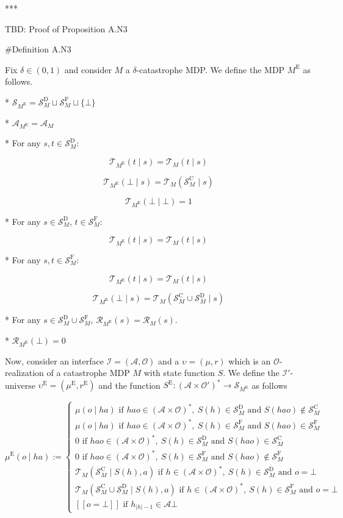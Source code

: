 \documentclass[a4paper]{article}
\newcommand{\AP}[1]{\left(#1\right)}
\newcommand{\Abs}[1]{\lvert #1 \rvert}
\newcommand{\Ob}{\mathcal{O}}
\newcommand{\A}{\mathcal{A}}
\newcommand{\St}{\mathcal{S}}
\newcommand{\T}{\mathcal{T}}
\newcommand{\R}{\mathcal{R}}
\newcommand{\In}{\mathcal{I}}
\newcommand{\FH}{(\A \times \Ob)^*}
\newcommand{\RMC}{\mathrm{C}}
\newcommand{\RMD}{\mathrm{D}}
\newcommand{\RME}{\mathrm{E}}
\newcommand{\RMF}{\mathrm{F}}
\newcommand{\SF}{\St^{\RMF}}
\newcommand{\SD}{\St^{\RMD}}
\newcommand{\SC}{\St^{\RMC}}
\newcommand{\ME}{M^{\RME}}
\begin{document}
***

TBD: Proof of Proposition A.N3

\#Definition A.N3

Fix $\delta\in(0,1)$ and consider $M$ a $\delta$-catastrophe MDP. We define the MDP $\ME$ as follows.

* $\St_{\ME} = \SD_M \sqcup \SF_M \sqcup \{\bot\}$

* $\A_{\ME} = \A_M$

* For any $s,t \in \SD_M$:

$$\T_{\ME}(t \mid s) = \T_M(t \mid s)$$

$$\T_{\ME}(\bot \mid s) = \T_M(\SC_M \mid s)$$

$$\T_{\ME}(\bot \mid \bot) = 1$$

* For any $s \in \SD_M$, $t \in \SF_M$:

$$\T_{\ME}(t \mid s) = \T_M(t \mid s)$$

* For any $s,t \in \SF_M$:

$$\T_{\ME}(t \mid s) = \T_M(t \mid s)$$

$$\T_{\ME}(\bot \mid s) = \T_M(\SC_M \cup \SD_M \mid s)$$

* For any $s \in \SD_M \cup \SF_M$, $\R_{\ME}(s) = \R_M(s)$.

* $\R_{\ME}(\bot) = 0$

Now, consider an interface $\In=(\A,\Ob)$ and a $\upsilon=(\mu,r)$ which is an $\Ob$-realization of a catastrophe MDP $M$ with state function $S$. We define the $\In'$-universe $\upsilon^\RME=(\mu^\RME,r^\RME)$ and the function $S^\RME: \AP{\A \times \Ob'}^* \rightarrow \St_{\ME}$ as follows

$$\mu^\RME(o \mid ha) := \begin{cases} \mu(o \mid ha) \text{ if } hao\in\FH,\ S(h) \in \SD_M \text{ and } S(hao)\not\in\SC_M \\ \mu(o \mid ha) \text{ if } hao\in\FH,\ S(h) \in \SF_M \text{ and } S(hao)\in\SF_M \\ 0 \text{ if } hao\in\FH,\ S(h)\in\SD_M \text{ and } S(hao)\in\SC_M \\ 0 \text{ if } hao\in\FH,\ S(h)\in\SF_M \text{ and } S(hao)\not\in\SF_M \\ \T_M\AP{\SC_M \mid S(h),a} \text{ if } h\in\FH,\ S(h)\in\SD_M \text{ and } o=\bot \\ \T_M\AP{\SC_M \cup \SD_M \mid S(h),a} \text{ if } h\in\FH,\ S(h) \in \SF_M \text{ and } o=\bot \\ [[o=\bot]] \text{ if } h_{\Abs{h}-1} \in \A  \bot\end{cases}$$
\end{document}

